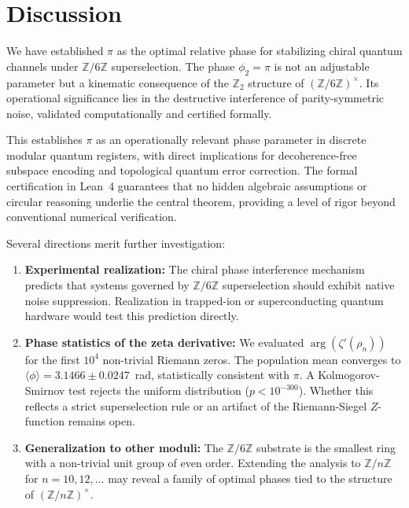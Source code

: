 \documentclass[aps,pra,twocolumn,10pt,superscriptaddress]{revtex4-2}
\newcommand{\Zmod}{\mathbb{Z}/6\mathbb{Z}}
\begin{document}
\section{Discussion}
\label{sec:discussion}

We have established $\pi$ as the optimal relative phase for stabilizing chiral quantum channels under $\Zmod$ superselection. The phase $\phi_2 = \pi$ is not an adjustable parameter but a kinematic consequence of the $\mathbb{Z}_2$ structure of $(\Zmod)^\times$. Its operational significance lies in the destructive interference of parity-symmetric noise, validated computationally and certified formally.

This establishes $\pi$ as an operationally relevant phase parameter in discrete modular quantum registers, with direct implications for decoherence-free subspace encoding and topological quantum error correction. The formal certification in Lean~4 guarantees that no hidden algebraic assumptions or circular reasoning underlie the central theorem, providing a level of rigor beyond conventional numerical verification.

Several directions merit further investigation:

\begin{enumerate}
\item \textbf{Experimental realization:} The chiral phase interference mechanism predicts that systems governed by $\Zmod$ superselection should exhibit native noise suppression. Realization in trapped-ion or superconducting quantum hardware would test this prediction directly.

\item \textbf{Phase statistics of the zeta derivative:} We evaluated $\arg(\zeta'(\rho_n))$ for the first $10^4$ non-trivial Riemann zeros. The population mean converges to $\langle\phi\rangle = 3.1466 \pm 0.0247$~rad, statistically consistent with $\pi$. A Kolmogorov-Smirnov test rejects the uniform distribution ($p < 10^{-300}$). Whether this reflects a strict superselection rule or an artifact of the Riemann-Siegel $Z$-function remains open.

\item \textbf{Generalization to other moduli:} The $\Zmod$ substrate is the smallest ring with a non-trivial unit group of even order. Extending the analysis to $\mathbb{Z}/n\mathbb{Z}$ for $n = 10, 12, \dots$ may reveal a family of optimal phases tied to the structure of $(\mathbb{Z}/n\mathbb{Z})^\times$.
\end{enumerate}
\end{document}
